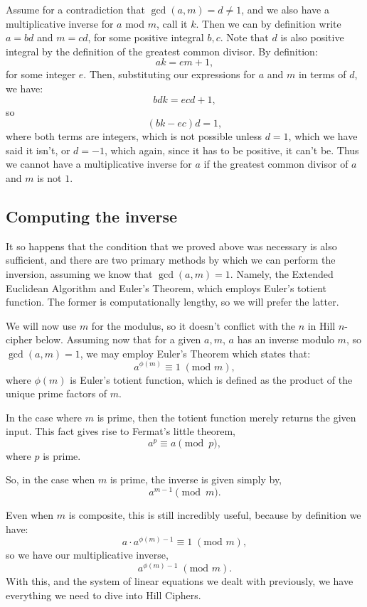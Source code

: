 \documentclass{article}
\begin{document}
\noindent Assume for a contradiction that $\gcd(a, m) = d \neq 1$, and we also have a multiplicative inverse for $a$ mod $m$, call it $k$. Then we can by definition write $a = bd$ and $m = cd$, for some positive integral $b, c$. Note that $d$ is also positive integral by the definition of the greatest common divisor. By definition:
\[
    ak = em + 1,
\]
for some integer $e$. Then, substituting our expressions for $a$ and $m$ in terms of $d$, we have:
\[
    bdk = ecd + 1,
\]
so
\[
    (bk - ec)d = 1,
\]
where both terms are integers, which is not possible unless $d = 1$, which we have said it isn't, or $d = -1$, which again, since it has to be positive, it can't be. Thus we cannot have a multiplicative inverse for $a$ if the greatest common divisor of $a$ and $m$ is not $1$. \medskip

\subsection{Computing the inverse}
It so happens that the condition that we proved above was necessary is also sufficient, and there are two primary methods by which we can perform the inversion, assuming we know that $\gcd(a, m) = 1$. Namely, the Extended Euclidean Algorithm and Euler's Theorem, which employs Euler's totient function. The former is computationally lengthy, so we will prefer the latter.

\noindent We will now use $m$ for the modulus, so it doesn't conflict with the $n$ in Hill $n$-cipher below. Assuming now that for a given $a, m$, $a$ has an inverse modulo $m$, so $\gcd(a, m) = 1$, we may employ Euler's Theorem which states that:
\[
    a^{\phi(m)} \equiv 1 \; (\text{mod } m),
\]
where $\phi(m)$ is Euler's totient function, which is defined as the product of the unique prime factors of $m$. \medskip

\noindent In the case where $m$ is prime, then the totient function merely returns the given input. This fact gives rise to Fermat's little theorem, 
\[
    a^p \equiv a \pmod{p}
,\] 
where $p$ is prime.

\noindent So, in the case when $m$ is prime, the inverse is given simply by,
 \[
   a^{m-1} \pmod{m}
.\] 

\noindent Even when $m$ is composite, this is still incredibly useful, because by definition we have:
\[
    a \cdot a^{\phi(m) - 1} \equiv 1 \; (\text{mod } m),
\]
so we have our multiplicative inverse,
\[
    a^{\phi(m) - 1} \; (\text{mod } m).
\]
With this, and the system of linear equations we dealt with previously, we have everything we need to dive into Hill Ciphers.
\end{document}
